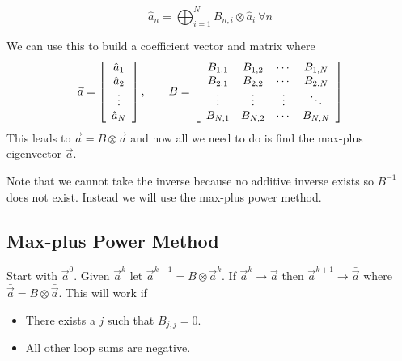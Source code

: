 \begin{equation*}
\hat{a}_n = \bigoplus_{i=1}^N B_{n,i}\otimes\hat{a}_i~\forall n
\end{equation*}


We can use this to build a coefficient vector and matrix where
\begin{align*}
\vec{a} = \left[\begin{array}{c} \hat{a}_1 \\ \hat{a}_2 \\ \vdots \\ \hat{a}_N \end{array}\right], \qquad
B = \left[\begin{array}{c c c c} B_{1,1} & B_{1,2} & \cdots & B_{1,N} \\ B_{2,1} & B_{2,2} & \cdots & B_{2,N} \\ \vdots & \vdots & \vdots & \ddots \\ B_{N,1} & B_{N,2} & \cdots & B_{N,N} \end{array}\right]
\end{align*}
This leads to $\vec{a} = B\otimes\vec{a}$ and now all we need to do is find the max-plus eigenvector $\vec{a}$.

Note that we cannot take the inverse because no additive inverse exists so $B^{-1}$ does not exist.
Instead we will use the max-plus power method.

\subsection{Max-plus Power Method}
Start with $\vec{a}^0$.
Given $\vec{a}^k$ let $\vec{a}^{k+1}=B\otimes\vec{a}^k$.
If $\vec{a}^k\to\vec{a}$ then $\vec{a}^{k+1}\to\bar{\vec{a}}$ where $\bar{\vec{a}}=B\otimes\bar{\vec{a}}$.
This will work if
\begin{itemize}
\item There exists a $j$ such that $B_{j,j}=0$.
\item All other loop sums are negative.
\end{itemize}

